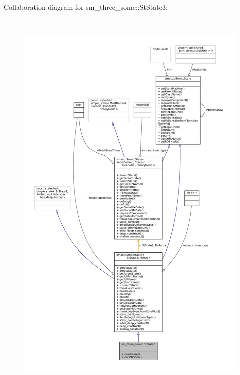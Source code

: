 Collaboration diagram for sm\+\_\+three\+\_\+some\+:\+:St\+State3\+:
\nopagebreak
\begin{figure}[H]
\begin{center}
\leavevmode
\includegraphics[height=550pt]{structsm__three__some_1_1StState3__coll__graph}
\end{center}
\end{figure}
